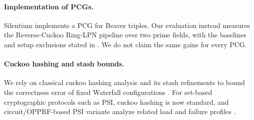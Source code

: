 \paragraph{Implementation of PCGs.}
Silentium \cite{silentium} implements a PCG for Beaver triples.
Our evaluation instead measures the Reverse-Cuckoo Ring-LPN pipeline over
two prime fields, with the baselines and setup exclusions stated in
. We do not claim the same gains for every PCG.

\paragraph{Cuckoo hashing and stash bounds.}
We rely on classical cuckoo hashing analysis and its stash refinements to bound the correctness error of fixed Waterfall configurations \cite{cuckoo,kirsch2010more,DBLP:journals/corr/abs-1204-4431}. For set-based cryptographic protocols such as PSI, cuckoo hashing is now standard, and circuit/OPPRF-based PSI variants analyze related load and failure profiles \cite{pinkas2018efficient,demmler2018pir,yeo2025private}.
